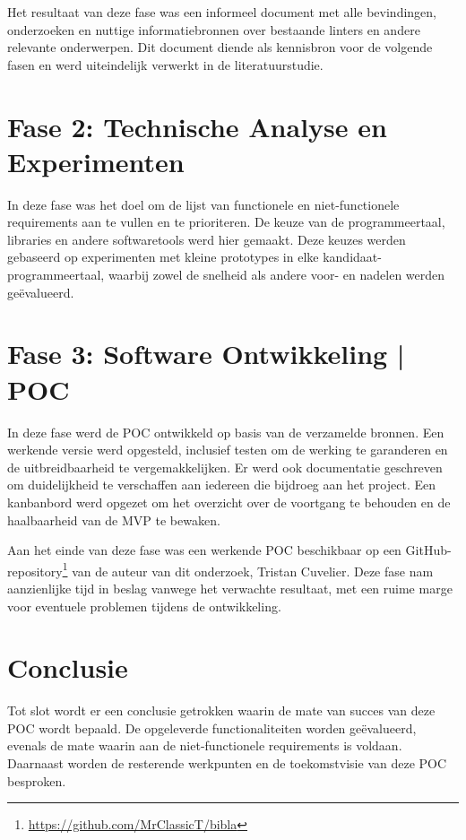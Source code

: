 Het resultaat van deze fase was een informeel document met alle bevindingen, onderzoeken en nuttige informatiebronnen over bestaande linters en andere relevante onderwerpen. Dit document diende als kennisbron voor de volgende fasen en werd uiteindelijk verwerkt in de literatuurstudie.

\section{Fase 2: Technische Analyse en Experimenten}
In deze fase was het doel om de lijst van functionele en niet-functionele requirements aan te vullen en te prioriteren. De keuze van de programmeertaal, libraries en andere softwaretools werd hier gemaakt. Deze keuzes werden gebaseerd op experimenten met kleine prototypes in elke kandidaat-programmeertaal, waarbij zowel de snelheid als andere voor- en nadelen werden geëvalueerd.

\section{Fase 3: Software Ontwikkeling | \acrlong{POC}}
In deze fase werd de \acrlong{POC} ontwikkeld op basis van de verzamelde bronnen. Een werkende versie werd opgesteld, inclusief testen om de werking te garanderen en de uitbreidbaarheid te vergemakkelijken. Er werd ook documentatie geschreven om duidelijkheid te verschaffen aan iedereen die bijdroeg aan het project. Een kanbanbord werd opgezet om het overzicht over de voortgang te behouden en de haalbaarheid van de MVP te bewaken.

Aan het einde van deze fase was een werkende \acrlong{POC} beschikbaar op een GitHub-repository\footnote{\url{https://github.com/MrClassicT/bibla}} van de auteur van dit onderzoek, Tristan Cuvelier. Deze fase nam aanzienlijke tijd in beslag vanwege het verwachte resultaat, met een ruime marge voor eventuele problemen tijdens de ontwikkeling.

\section{Conclusie}

Tot slot wordt er een conclusie getrokken waarin de mate van succes van deze \acrlong{POC} wordt bepaald. De opgeleverde functionaliteiten worden geëvalueerd, evenals de mate waarin aan de niet-functionele requirements is voldaan. Daarnaast worden de resterende werkpunten en de toekomstvisie van deze \acrlong{POC} besproken.